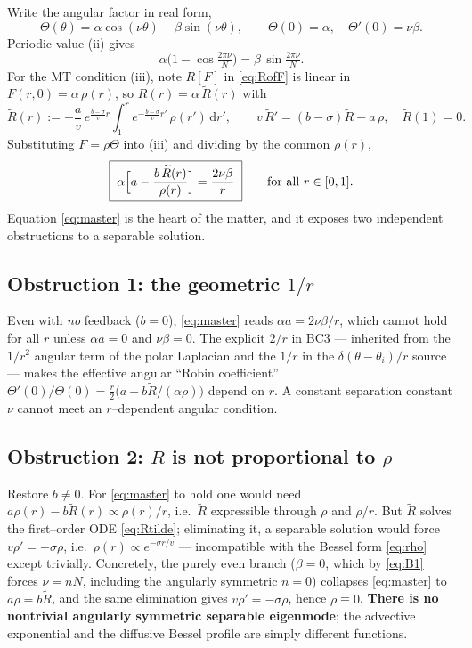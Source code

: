 \documentclass{article}
\newcommand{\rd}{\mathrm{d}}
\begin{document}
Write the angular factor in real form,
\begin{equation}
\Theta(\theta)=\alpha\cos(\nu\theta)+\beta\sin(\nu\theta),
\qquad
\Theta(0)=\alpha,\quad \Theta'(0)=\nu\beta .
\end{equation}
Periodic value (ii) gives
\begin{equation}
\alpha\bigl(1-\cos\tfrac{2\pi\nu}{N}\bigr)=\beta\,\sin\tfrac{2\pi\nu}{N}.
\label{eq:B1}
\end{equation}
For the MT condition (iii), note $R[F]$ in \eqref{eq:RofF} is linear in
$F(r,0)=\alpha\,\rho(r)$, so $R(r)=\alpha\,\widetilde R(r)$ with
\begin{equation}
\widetilde R(r):=-\frac{a}{v}\,e^{\frac{b-\sigma}{v}r}
\int_{1}^{r} e^{-\frac{b-\sigma}{v}r'}\,\rho(r')\,\rd r',
\qquad
v\,\widetilde R'=(b-\sigma)\widetilde R-a\,\rho,\quad \widetilde R(1)=0.
\label{eq:Rtilde}
\end{equation}
Substituting $F=\rho\Theta$ into (iii) and dividing by the common $\rho(r)$,
\begin{equation}
\boxed{\;
\alpha\Bigl[a-\frac{b\,\widetilde R(r)}{\rho(r)}\Bigr]
=\frac{2\nu\beta}{r}\;}
\qquad\text{for all }r\in[0,1].
\label{eq:master}
\end{equation}
Equation \eqref{eq:master} is the heart of the matter, and it exposes two
independent obstructions to a separable solution.

\subsection{Obstruction 1: the geometric $1/r$}
Even with \emph{no} feedback ($b=0$), \eqref{eq:master} reads
$\alpha a=2\nu\beta/r$, which cannot hold for all $r$ unless $\alpha a=0$ and
$\nu\beta=0$. The explicit $2/r$ in BC3 --- inherited from the $1/r^{2}$ angular
term of the polar Laplacian and the $1/r$ in the $\delta(\theta-\theta_i)/r$
source --- makes the effective angular ``Robin coefficient''
$\Theta'(0)/\Theta(0)=\tfrac{r}{2}\bigl(a-b\widetilde R/(\alpha\rho)\bigr)$
depend on $r$. A constant separation constant $\nu$ cannot meet an
$r$--dependent angular condition.

\subsection{Obstruction 2: $R$ is not proportional to $\rho$}
Restore $b\neq0$. For \eqref{eq:master} to hold one would need
$a\rho(r)-b\widetilde R(r)\propto \rho(r)/r$, i.e.\ $\widetilde R$ expressible
through $\rho$ and $\rho/r$. But $\widetilde R$ solves the first--order ODE
\eqref{eq:Rtilde}; eliminating it, a separable solution would force
$v\rho'=-\sigma\rho$, i.e.\ $\rho(r)\propto e^{-\sigma r/v}$ --- incompatible
with the Bessel form \eqref{eq:rho} except trivially. Concretely, the purely
even branch ($\beta=0$, which by \eqref{eq:B1} forces $\nu=nN$, including the
angularly symmetric $n=0$) collapses \eqref{eq:master} to
$a\rho=b\widetilde R$, and the same elimination gives $v\rho'=-\sigma\rho$,
hence $\rho\equiv0$. \textbf{There is no nontrivial angularly symmetric
separable eigenmode}; the advective exponential and the diffusive Bessel
profile are simply different functions.
\end{document}
